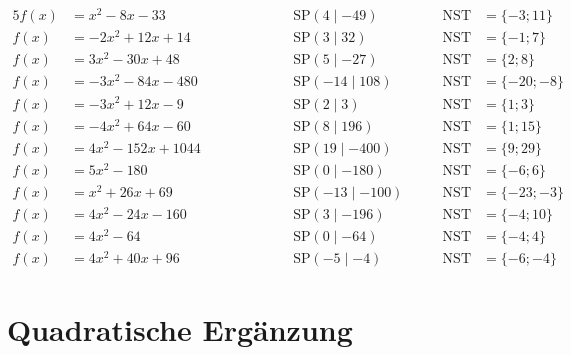 \documentclass
[
  draft    = true,
  fontsize = 11pt,
  parskip  = half-,
  BCOR     = 0pt,
  DIV      = 11
]
{scrartcl}
\begin{document}
\begin{alignat*}{5}
  f(x)&=x^{2}-8x-33 \qquad&\qquad \quad&\text{SP}(4\mid-49) \quad&\quad \text{NST}&=\{-3;11\} \\[0.5ex]
  f(x)&=-2x^{2}+12x+14 \qquad&\qquad \quad&\text{SP}(3\mid32) \quad&\quad \text{NST}&=\{-1;7\} \\[0.5ex]
  f(x)&=3x^{2}-30x+48 \qquad&\qquad \quad&\text{SP}(5\mid-27) \quad&\quad \text{NST}&=\{2;8\} \\[0.5ex]
  f(x)&=-3x^{2}-84x-480 \qquad&\qquad \quad&\text{SP}(-14\mid108) \quad&\quad \text{NST}&=\{-20;-8\} \\[0.5ex]
  f(x)&=-3x^{2}+12x-9 \qquad&\qquad \quad&\text{SP}(2\mid3) \quad&\quad \text{NST}&=\{1;3\} \\[0.5ex]
  f(x)&=-4x^{2}+64x-60 \qquad&\qquad \quad&\text{SP}(8\mid196) \quad&\quad \text{NST}&=\{1;15\} \\[0.5ex]
  f(x)&=4x^{2}-152x+1044 \qquad&\qquad \quad&\text{SP}(19\mid-400) \quad&\quad \text{NST}&=\{9;29\} \\[0.5ex]
  f(x)&=5x^{2}-180 \qquad&\qquad \quad&\text{SP}(0\mid-180) \quad&\quad \text{NST}&=\{-6;6\} \\[0.5ex]
  f(x)&=x^{2}+26x+69 \qquad&\qquad \quad&\text{SP}(-13\mid-100) \quad&\quad \text{NST}&=\{-23;-3\} \\[0.5ex]
  f(x)&=4x^{2}-24x-160 \qquad&\qquad \quad&\text{SP}(3\mid-196) \quad&\quad \text{NST}&=\{-4;10\} \\[0.5ex]
  f(x)&=4x^{2}-64 \qquad&\qquad \quad&\text{SP}(0\mid-64) \quad&\quad \text{NST}&=\{-4;4\} \\[0.5ex]
  f(x)&=4x^{2}+40x+96 \qquad&\qquad \quad&\text{SP}(-5\mid-4) \quad&\quad \text{NST}&=\{-6;-4\}
\end{alignat*}

\clearpage
\section*{Quadratische Ergänzung}
\end{document}
